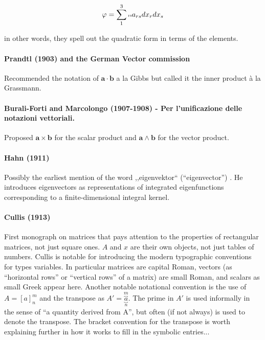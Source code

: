 \[
\varphi = \sum_1^3 \text{\tiny{rs}} a_{rs} dx_r dx_s
\]

in other words, they spell out the quadratic form in terms of the elements.



\paragraph{Prandtl (1903) and the German Vector commission}

Recommended the notation of $\mathbf{a} \cdot \mathbf{b}$ a la Gibbs but called it the inner product à la Grassmann.



\paragraph{Burali-Forti and Marcolongo (1907-1908) - Per l’unificazione delle notazioni vettoriali.}

Proposed $\mathbf{a}\times\mathbf{b}$ for the scalar product and  $\mathbf{a}\wedge\mathbf{b}$ for the vector product.



\paragraph{Hahn (1911)~\cite{Hahn1911}}

Possibly the earliest mention of the word ,,eigenvektor`` (``eigenvector'') \cite[p. 35]{Hahn1911}.
He introduces eigenvectors as representations of integrated eigenfunctions corresponding to a finite-dimensional integral kernel.



\paragraph{Cullis (1913)}

First monograph on matrices that pays attention to the properties of
rectangular matrices, not just square ones. $A$ and $x$ are their own objects,
not just tables of numbers.
Cullis is notable for introducing the modern typographic conventions for types
variables. In particular matrices are capital Roman, vectors (as ``horizontal
rows'' or ``vertical rows'' of a matrix) are small Roman, and scalars as small
Greek appear here.  Another notable notational convention is the use of $A =
{[a]}^m_n$ and the transpose as $A' = \overbracket{\underbracket{a}}^m_n$. The
prime in $A'$ is used informally in the sense of ``a quantity derived from A'',
but often (if not always) is used to denote the transpose.
The bracket convention for the transpose is worth explaining further in how it
works to fill in the symbolic entries...

